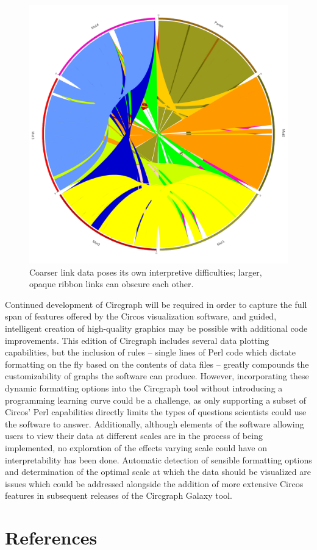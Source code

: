 \documentclass[twocolumn]{article}
\begin{document}
\begin{figure}
\centering
\includegraphics[scale=0.1]{./Generated_Color_Fixes.png}
\caption{Coarser link data poses its own interpretive difficulties; larger, opaque ribbon links can obscure each other.}
\end{figure}

Continued development of Circgraph will be required in order to capture the full span of features offered by the Circos visualization software, and guided, intelligent creation of high-quality graphics may be possible with additional code improvements. This edition of Circgraph includes several data plotting capabilities, but the inclusion of rules -- single lines of Perl code which dictate formatting on the fly based on the contents of data files -- greatly compounds the customizability of graphs the software can produce. However, incorporating these dynamic formatting options into the Circgraph tool without introducing a programming learning curve could be a challenge, as only supporting a subset of Circos' Perl capabilities directly limits the types of questions scientists could use the software to answer. Additionally, although elements of the software allowing users to view their data at different scales are in the process of being implemented, no exploration of the effects varying scale could have on interpretability has been done. Automatic detection of sensible formatting options and determination of the optimal scale at which the data should be visualized are issues which could be addressed alongside the addition of more extensive Circos features in subsequent releases of the Circgraph Galaxy tool.

\section*{References}
\printbibliography
\end{document}
